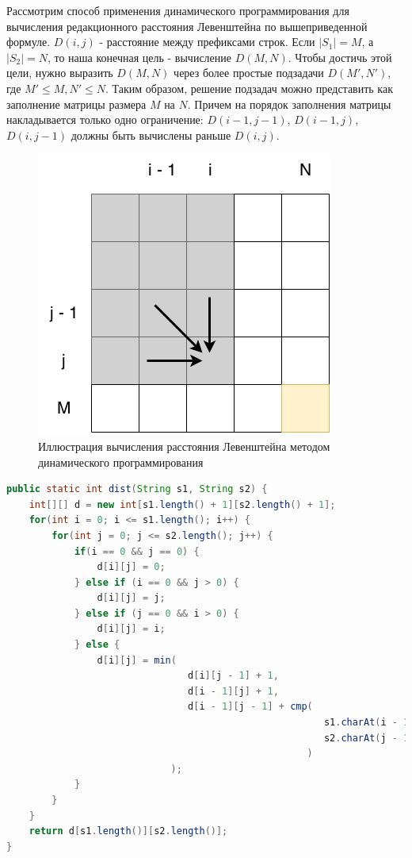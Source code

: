Рассмотрим способ применения динамического программирования для вычисления редакционного расстояния Левенштейна по вышеприведенной формуле. \(D(i, j)\) - расстояние между префиксами строк. Если \(|S_1| = M\), а \(|S_2| = N\), то наша конечная цель - вычисление \(D(M, N)\). Чтобы достичь этой цели, нужно выразить \(D(M, N)\) через более простые подзадачи \(D(M', N')\), где \(M' \leq M, N' \leq N\). Таким образом, решение подзадач можно представить как заполнение матрицы размера \(M\) на \(N\). Причем на порядок заполнения матрицы накладывается только одно ограничение: \(D(i - 1, j - 1)\), \(D(i - 1, j)\), \(D(i, j - 1)\) должны быть вычислены раньше \(D(i, j)\).
\begin{figure}[H]
	\centering
	\includegraphics[scale=0.5]{img/levenstein.png}
	\caption{Иллюстрация вычисления расстояния Левенштейна методом динамического программирования}
\end{figure}
\begin{lstlisting}[caption={Пример реализации вычисления расстояния Левенштейна}, language=Java]
public static int dist(String s1, String s2) {
    int[][] d = new int[s1.length() + 1][s2.length() + 1];
    for(int i = 0; i <= s1.length(); i++) {
        for(int j = 0; j <= s2.length(); j++) {
            if(i == 0 && j == 0) {
                d[i][j] = 0;
            } else if (i == 0 && j > 0) {
                d[i][j] = j;
            } else if (j == 0 && i > 0) {
                d[i][j] = i;
            } else {
                d[i][j] = min(
                				d[i][j - 1] + 1, 
                				d[i - 1][j] + 1,
                        		d[i - 1][j - 1] + cmp(
                        								s1.charAt(i - 1), 
                        								s2.charAt(j - 1)
                        							 )
                        	 );
            }
        }
    }
    return d[s1.length()][s2.length()];
}
\end{lstlisting}

